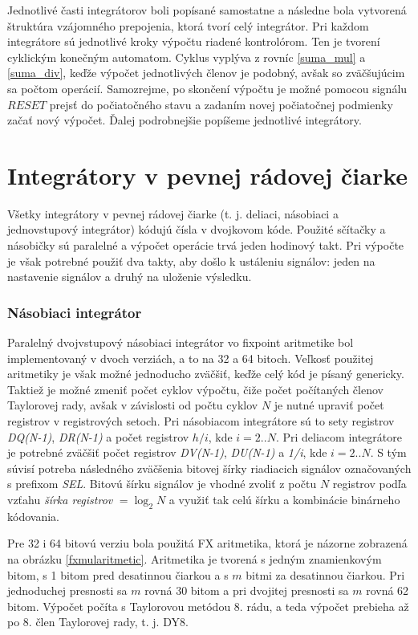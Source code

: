 Jednotlivé časti integrátorov boli popísané samostatne a následne bola vytvorená štruktúra vzájomného prepojenia, ktorá tvorí celý integrátor. Pri každom integrátore sú jednotlivé kroky výpočtu riadené kontrolórom. Ten je tvorení cyklickým konečným automatom. Cyklus vyplýva z rovníc \eqref{suma_mul} a \eqref{suma_div}, keďže výpočet jednotlivých členov je podobný, avšak so zväčšujúcim sa počtom operácií. Samozrejme, po skončení výpočtu je možné pomocou signálu $ RESET $ prejsť do počiatočného stavu a zadaním novej počiatočnej podmienky začať nový výpočet. Ďalej podrobnejšie popíšeme jednotlivé integrátory.

\section{Integrátory v pevnej rádovej čiarke}
Všetky integrátory v pevnej rádovej čiarke (t. j. deliaci, násobiaci a jednovstupový integrátor) kódujú čísla v dvojkovom kóde. Použité sčítačky a násobičky sú paralelné a výpočet operácie trvá jeden hodinový takt. Pri výpočte je však potrebné použiť dva takty, aby došlo k ustáleniu signálov: jeden na nastavenie signálov a druhý na uloženie výsledku.

\subsubsection*{Násobiaci integrátor}

Paralelný dvojvstupový násobiaci integrátor vo fixpoint aritmetike bol implementovaný v dvoch verziách, a to na 32 a 64 bitoch. Veľkosť použitej aritmetiky je však možné jednoducho zväčšiť, keďže celý kód je písaný genericky. Taktiež je možné zmeniť počet cyklov výpočtu, čiže počet počítaných členov Taylorovej rady, avšak v závislosti od počtu cyklov $ N $ je nutné upraviť počet registrov v registrových setoch. Pri násobiacom integrátore sú to sety registrov \textit{DQ(N-1)}, \textit{DR(N-1)} a počet registrov $ h/i $, kde $ i = 2..N $. Pri deliacom integrátore je potrebné zväčšiť počet registrov \textit{DV(N-1)}, \textit{DU(N-1)} a \textit{1/i}, kde $ i = 2..N $. S tým súvisí potreba následného zväčšenia bitovej šírky riadiacich signálov označovaných s prefixom \textit{SEL}. Bitovú šírku signálov je vhodné zvoliť z počtu $ N $ registrov podľa vzťahu \textit{šírka registrov} $ = \log_{2} N $ a využiť tak celú šírku a kombinácie binárneho kódovania.

Pre 32 i 64 bitovú verziu bola použitá FX aritmetika, ktorá je názorne zobrazená na obrázku \ref{fxmularitmetic}. Aritmetika je tvorená s jedným znamienkovým bitom, s 1 bitom pred desatinnou čiarkou a s $ m $ bitmi za desatinnou čiarkou. Pri jednoduchej presnosti sa $ m $ rovná 30 bitom a pri dvojitej presnosti sa $ m $ rovná 62 bitom. Výpočet počíta s Taylorovou metódou 8. rádu, a teda výpočet prebieha až po 8. člen Taylorovej rady, t. j. DY8.

